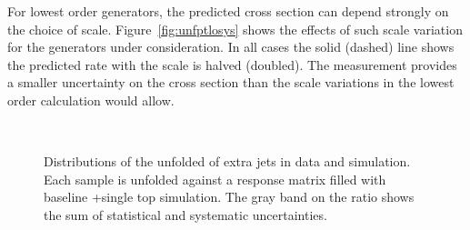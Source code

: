  For lowest order generators, the predicted cross section can depend strongly on the choice of 
scale.  Figure~\ref{fig:unfptlosys} shows the effects of such scale variation for the generators under consideration.  In all cases the solid
(dashed) line shows the predicted rate with the scale is halved (doubled).  The measurement provides a smaller uncertainty on the cross section than the 
scale variations in the lowest order calculation would allow.
\begin{figure}
\centering
{}
 \\
\caption{Distributions of the unfolded \pt of extra jets in data and simulation. Each sample is unfolded against a response matrix filled with baseline \ttbar+single top simulation. The gray band on the ratio shows the sum of statistical and systematic uncertainties.}
\label{fig:unfpt}
\end{figure}


